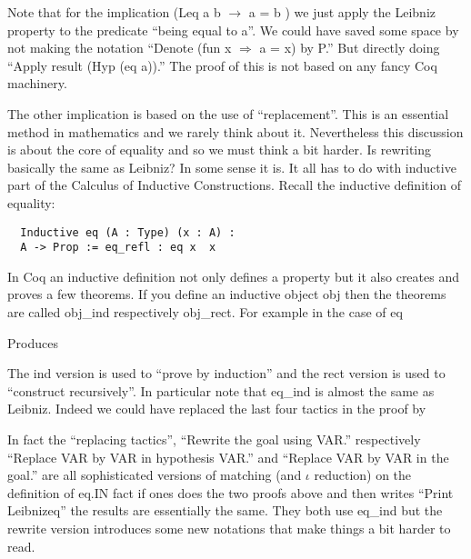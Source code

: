 Note that for the implication (Leq a b $\rightarrow$ a = b ) we just apply the Leibniz property to the predicate ``being equal to a''. We could have saved some space by not making the notation ``Denote (fun x $\Rightarrow$ a = x) by P.'' But directly doing ``Apply result (Hyp (eq a)).''  The proof of this is not based on any fancy Coq machinery. 

The other implication is based on the use of ``replacement''. This is an essential method in mathematics and we rarely think about it.  Nevertheless this discussion is about the core of equality and so we must think a bit harder. Is rewriting  basically the same as Leibniz? In some sense it is. It all has to do with inductive part of the Calculus of Inductive Constructions. Recall the inductive definition of equality:
  \begin{verbatim}
  Inductive eq (A : Type) (x : A) :
  A -> Prop := eq_refl : eq x  x
  \end{verbatim}
  
  In Coq an inductive definition not only defines a property but it also creates and proves a few theorems. If you define an inductive object obj then the theorems are called obj\_ind respectively obj\_rect. For example in the case of eq
 
 Produces 

 The ind version is used to ``prove by induction'' and the rect version is used to ``construct recursively''. In particular note that eq\_ind is almost the same as Leibniz. Indeed we could have replaced the last four tactics in the proof by

In fact the ``replacing tactics'',  ``Rewrite the goal using VAR.'' respectively ``Replace VAR by VAR in hypothesis VAR.'' and ``Replace VAR by VAR in the goal.'' are all sophisticated versions of matching  (and $\iota$ reduction) on the definition of eq.IN fact if ones does the two proofs above and then writes ``Print Leibnizeq'' the results are essentially the same. They both use eq\_ind but the rewrite version introduces some new notations that make things a bit harder to read.

